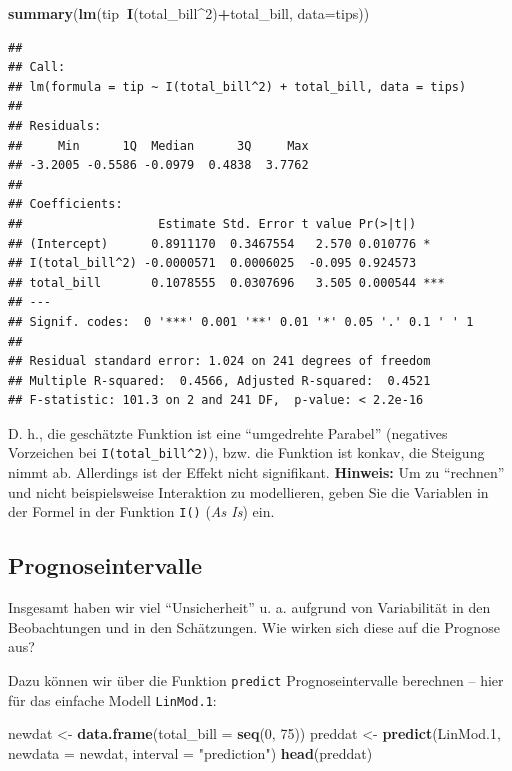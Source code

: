 \documentclass[12pt,ngerman,paper=a4,pagesize,DIV=13]{scrreprt}
\newenvironment{Shaded}{\begin{snugshade}}{\end{snugshade}}
\newcommand{\DataTypeTok}[1]{\textcolor[rgb]{0.13,0.29,0.53}{#1}}
\newcommand{\DecValTok}[1]{\textcolor[rgb]{0.00,0.00,0.81}{#1}}
\newcommand{\FloatTok}[1]{\textcolor[rgb]{0.00,0.00,0.81}{#1}}
\newcommand{\KeywordTok}[1]{\textcolor[rgb]{0.13,0.29,0.53}{\textbf{#1}}}
\newcommand{\NormalTok}[1]{#1}
\newcommand{\OperatorTok}[1]{\textcolor[rgb]{0.81,0.36,0.00}{\textbf{#1}}}
\newcommand{\StringTok}[1]{\textcolor[rgb]{0.31,0.60,0.02}{#1}}
\begin{document}
\begin{Shaded}
\begin{Highlighting}[]
\KeywordTok{summary}\NormalTok{(}\KeywordTok{lm}\NormalTok{(tip}\OperatorTok{~}\KeywordTok{I}\NormalTok{(total_bill}\OperatorTok{^}\DecValTok{2}\NormalTok{)}\OperatorTok{+}\NormalTok{total_bill, }\DataTypeTok{data=}\NormalTok{tips))}
\end{Highlighting}
\end{Shaded}

\begin{verbatim}
## 
## Call:
## lm(formula = tip ~ I(total_bill^2) + total_bill, data = tips)
## 
## Residuals:
##     Min      1Q  Median      3Q     Max 
## -3.2005 -0.5586 -0.0979  0.4838  3.7762 
## 
## Coefficients:
##                   Estimate Std. Error t value Pr(>|t|)    
## (Intercept)      0.8911170  0.3467554   2.570 0.010776 *  
## I(total_bill^2) -0.0000571  0.0006025  -0.095 0.924573    
## total_bill       0.1078555  0.0307696   3.505 0.000544 ***
## ---
## Signif. codes:  0 '***' 0.001 '**' 0.01 '*' 0.05 '.' 0.1 ' ' 1
## 
## Residual standard error: 1.024 on 241 degrees of freedom
## Multiple R-squared:  0.4566, Adjusted R-squared:  0.4521 
## F-statistic: 101.3 on 2 and 241 DF,  p-value: < 2.2e-16
\end{verbatim}

D. h., die geschätzte Funktion ist eine \enquote{umgedrehte Parabel}
(negatives Vorzeichen bei \texttt{I(total\_bill\^{}2)}), bzw. die
Funktion ist konkav, die Steigung nimmt ab. Allerdings ist der Effekt
nicht signifikant. \textbf{Hinweis:} Um zu \enquote{rechnen} und nicht
beispielsweise Interaktion zu modellieren, geben Sie die Variablen in
der Formel in der Funktion \texttt{I()} (\emph{As Is}) ein.

\hypertarget{prognoseintervalle}{%
\subsection{Prognoseintervalle}\label{prognoseintervalle}}

Insgesamt haben wir viel \enquote{Unsicherheit} u. a. aufgrund von
Variabilität in den Beobachtungen und in den Schätzungen. Wie wirken
sich diese auf die Prognose aus?

Dazu können wir über die Funktion \texttt{predict} Prognoseintervalle
berechnen -- hier für das einfache Modell \texttt{LinMod.1}:

\begin{Shaded}
\begin{Highlighting}[]
\NormalTok{newdat <-}\StringTok{ }\KeywordTok{data.frame}\NormalTok{(}\DataTypeTok{total_bill =} \KeywordTok{seq}\NormalTok{(}\DecValTok{0}\NormalTok{, }\DecValTok{75}\NormalTok{))}
\NormalTok{preddat <-}\StringTok{ }\KeywordTok{predict}\NormalTok{(LinMod}\FloatTok{.1}\NormalTok{, }\DataTypeTok{newdata =}\NormalTok{ newdat, }\DataTypeTok{interval =} \StringTok{"prediction"}\NormalTok{)}
\KeywordTok{head}\NormalTok{(preddat)}
\end{Highlighting}
\end{Shaded}
\end{document}

